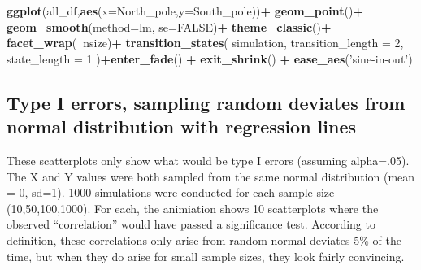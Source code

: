 \documentclass[]{book}
\newenvironment{Shaded}{\begin{snugshade}}{\end{snugshade}}
\newcommand{\DataTypeTok}[1]{\textcolor[rgb]{0.13,0.29,0.53}{#1}}
\newcommand{\DecValTok}[1]{\textcolor[rgb]{0.00,0.00,0.81}{#1}}
\newcommand{\KeywordTok}[1]{\textcolor[rgb]{0.13,0.29,0.53}{\textbf{#1}}}
\newcommand{\NormalTok}[1]{#1}
\newcommand{\OperatorTok}[1]{\textcolor[rgb]{0.81,0.36,0.00}{\textbf{#1}}}
\newcommand{\OtherTok}[1]{\textcolor[rgb]{0.56,0.35,0.01}{#1}}
\newcommand{\StringTok}[1]{\textcolor[rgb]{0.31,0.60,0.02}{#1}}
\begin{document}
\begin{Shaded}
\begin{Highlighting}[]
\KeywordTok{ggplot}\NormalTok{(all_df,}\KeywordTok{aes}\NormalTok{(}\DataTypeTok{x=}\NormalTok{North_pole,}\DataTypeTok{y=}\NormalTok{South_pole))}\OperatorTok{+}
\StringTok{  }\KeywordTok{geom_point}\NormalTok{()}\OperatorTok{+}
\StringTok{  }\KeywordTok{geom_smooth}\NormalTok{(}\DataTypeTok{method=}\NormalTok{lm, }\DataTypeTok{se=}\OtherTok{FALSE}\NormalTok{)}\OperatorTok{+}
\StringTok{  }\KeywordTok{theme_classic}\NormalTok{()}\OperatorTok{+}
\StringTok{  }\KeywordTok{facet_wrap}\NormalTok{(}\OperatorTok{~}\NormalTok{nsize)}\OperatorTok{+}
\StringTok{  }\KeywordTok{transition_states}\NormalTok{(}
\NormalTok{    simulation,}
    \DataTypeTok{transition_length =} \DecValTok{2}\NormalTok{,}
    \DataTypeTok{state_length =} \DecValTok{1}
\NormalTok{  )}\OperatorTok{+}\KeywordTok{enter_fade}\NormalTok{() }\OperatorTok{+}\StringTok{ }
\StringTok{  }\KeywordTok{exit_shrink}\NormalTok{() }\OperatorTok{+}
\StringTok{  }\KeywordTok{ease_aes}\NormalTok{(}\StringTok{'sine-in-out'}\NormalTok{)}
\end{Highlighting}
\end{Shaded}

\hypertarget{type-i-errors-sampling-random-deviates-from-normal-distribution-with-regression-lines}{%
\subsection{Type I errors, sampling random deviates from normal distribution with regression lines}\label{type-i-errors-sampling-random-deviates-from-normal-distribution-with-regression-lines}}

These scatterplots only show what would be type I errors (assuming alpha=.05). The X and Y values were both sampled from the same normal distribution (mean = 0, sd=1). 1000 simulations were conducted for each sample size (10,50,100,1000). For each, the animiation shows 10 scatterplots where the observed ``correlation'' would have passed a significance test. According to definition, these correlations only arise from random normal deviates 5\% of the time, but when they do arise for small sample sizes, they look fairly convincing.
\end{document}
